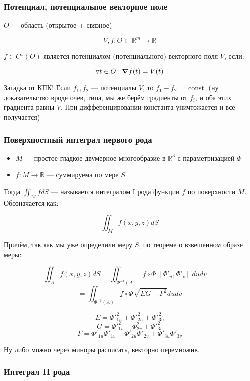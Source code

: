 \documentclass{article}
\DeclareMathOperator{\const}{const}
\begin{document}
\subsubsection{Потенциал, потенциальное векторное поле}
$O$ --- область (открытое + связное)

\[V, f: O \subset \mathbb{R}^m \rightarrow \mathbb{R}\]

$f \in C^1(O)$ является потенциалом (потенциального) векторного поля $V$, если:

\[\forall t \in O: \grad f(t) = V(t)\]

Загадка от КПК! Если $f_1, f_2$ --- потенциалы $V$, то $f_1 - f_2 = \const$ (ну доказательство вроде очев, типа, мы же берём градиенты от $f_i$, и оба этих градиента равны $V$. При дифференцировании константа уничтожается и всё получается)

\subsubsection{Поверхностный интеграл первого рода}

\begin{itemize}
    \item $M$ --- простое гладкое двумерное многообразие в $\mathbb{R}^3$ с параметризацией $\Phi$
    \item $f: M \rightarrow \mathbb{R}$ --- суммируема по мере $S$
\end{itemize}

Тогда $\iint_M f dS$ --- называется интегралом I рода функции $f$ по поверхности $M$. Обозначается как:

\[\iint_M f(x, y, z) dS \]

Причём, так как мы уже определили меру $S$, по теореме о взвешенном образе меры:

\[\iint_A f(x, y, z) dS = \iint_{\Phi^{-1}(A)} f \circ \Phi |[\Phi'_u, \Phi'_v]| du dv = \]
\[= \iint_{\Phi^{-1}(A)} f \circ \Phi \sqrt{EG - F^2} du dv\]

\[E = \Phi'^2_{1u} + \Phi'^2_{2u} + \Phi'^2_{3u}\]
\[G = \Phi'^2_{1v} + \Phi^2_{2v} + \Phi'^2_{3v}\]
\[F = \Phi'_{1u}\Phi'_{1v} + \Phi'_{2u}\Phi'_{2v} + \Phi'_{3u}\Phi'_{3v}\]

Ну либо можно через миноры расписать, векторно перемножив.

\subsubsection{Интеграл II рода}
\end{document}
